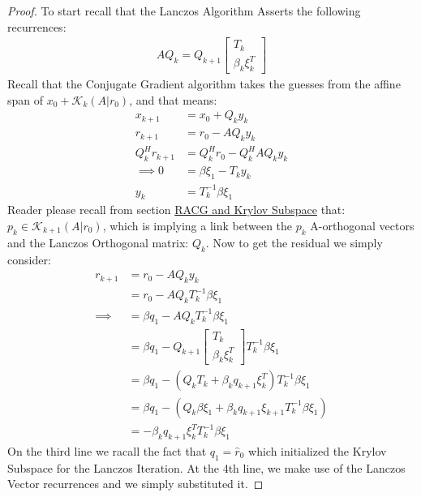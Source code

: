 \documentclass[]{article}
\theoremstyle{definition}
\begin{document}
            \begin{proof}
                To start recall that the Lanczos Algorithm Asserts the following recurrences:
                \begin{align}
                    AQ_k = Q_{k + 1} \begin{bmatrix}
                        T_k
                        \\
                        \beta_k \xi_k^T
                    \end{bmatrix}
                \end{align}
                Recall that the Conjugate Gradient algorithm takes the guesses from the affine span of $x_0 + \mathcal{K}_k(A|r_0)$, and that means: 
                \begin{align}
                    x_{k + 1} &= x_0 + Q_ky_k
                    \\
                    r_{k + 1} &= r_0 - AQ_k y_k
                    \\
                    Q^H_kr_{k + 1} &= Q_k^H r_0 - Q_k^HAQ_k y_k
                    \\
                    \implies
                    0 &= \beta\xi_1 - T_k y_k
                    \\
                    y_k &= T_k^{-1}\beta \xi_1
                \end{align}
                Reader please recall from section \hyperref[sec:RACG_and_Krylov_Subspace]{RACG and Krylov Subspace} that: $p_k \in \mathcal K_{k + 1}(A|r_0)$, which is implying a link between the $p_k$ A-orthogonal vectors and the Lanczos Orthogonal matrix: $Q_k$. Now to get the residual we simply consider: 
                \begin{align}
                    r_{k + 1} &= r_0 - AQ_k y_k
                    \\
                    &= r_0 - AQ_k T_k^{-1}\beta \xi_1
                    \\
                    \implies
                    &= \beta q_1 - AQ_k T_k^{-1} \beta\xi_1
                    \\
                    &= \beta q_1 - Q_{k + 1}\begin{bmatrix}
                        T_k \\ \beta_k \xi_k^T
                    \end{bmatrix}T_k^{-1} \beta\xi_1
                    \\
                    &= \beta q_1 - 
                    (Q_k T_k + \beta_k q_{k + 1}\xi_k^T)T_k^{-1} \beta\xi_1
                    \\
                    &= 
                    \beta q_1 - (Q_k \beta \xi_1 + \beta_k q_{k + 1}\xi_{k + 1}T_k^{-1}\beta \xi_1)
                    \\
                    &= -\beta_k q_{k + 1}\xi_k^TT_k^{-1} \beta \xi_1
                \end{align}
                On the third line we racall the fact that $q_1 = \hat{r}_0$ which initialized the Krylov Subspace for the Lanczos Iteration. At the 4th line, we make use of the Lanczos Vector recurrences and we simply substituted it.


\end{proof}
\end{document}
